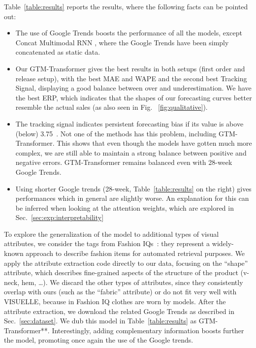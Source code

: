 \documentclass{article}
\newcommand{\datasetname}[0] {VISUELLE}
\newcommand{\approachname}[0] {GTM-Transformer\xspace}
\begin{document}
Table~\ref{table:results} reports the results, where the following facts can be pointed out: 
\begin{itemize}[noitemsep]
    \item The use of Google Trends boosts the performance of all the models, except Concat Multimodal RNN , where the Google Trends have been simply concatenated as static data.
    \item Our \approachname gives the best results in both setups (first order and release setup), with the best MAE and WAPE and the second best Tracking Signal, displaying a good balance between over and underestimation. We have the best ERP, which indicates that the shapes of our forecasting curves better resemble the actual sales (as also seen in Fig. ~\ref{fig:qualitative}).
    \item The tracking signal indicates persistent forecasting bias if its value is above (below) 3.75~\cite{brown2004smoothing,nahmias2009production}. Not one of the methods has this problem, including \approachname. This shows that even though the models have gotten much more complex, we are still able to maintain a strong balance between positive and negative errors. \approachname remains balanced even with 28-week Google Trends.
    \item Using shorter Google trends (28-week, Table~\ref{table:results} on the right) gives performances which in general are slightly worse. An explanation for this can be inferred when looking at the attention weights, which are explored in Sec.~\ref{sec:exp:interpretability}
\end{itemize}
To explore the generalization of the model to additional types of visual attributes, we consider the tags from Fashion IQs~\cite{wu2020fashion}: they represent a widely-known approach to describe fashion items for automated retrieval purposes. We apply the attribute extraction code directly to our data, focusing on the ``shape'' attribute, which describes fine-grained aspects of the structure of the product (v-neck, hem, \dots). We discard the other types of attributes, since they consistently overlap with ours (such as the ``fabric'' attribute) or do not fit very well with \datasetname, because in Fashion IQ clothes are worn by models. After the attribute extraction, we download the related Google Trends as described in Sec.~\ref{sec:dataset}. We dub this model in Table~\ref{table:results} as \approachname **. Interestingly, adding complementary information boosts further the model, promoting once again the use of the Google trends.    
\end{document}
